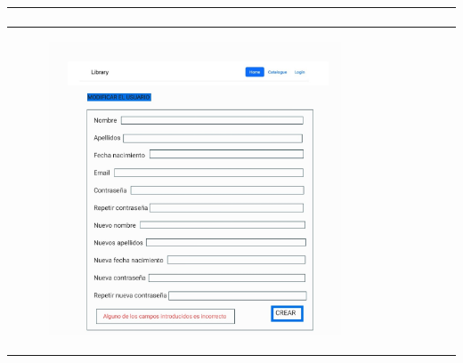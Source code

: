 \documentclass{report}
\begin{document}
\begin{center}
\begin{longtable}{|p{\linewidth}|}
\begin{figure}[H]
                        \end{figure}\\
                        \hline
                        \begin{figure}[H]
                            \centering
                            \includegraphics[width=0.8\textwidth]{./img/grafico/ErrorModificarUsu.jpg}
                        \end{figure}\\
                        \hline
                    \end{longtable}
                \end{center}
                \clearpage
\end{document}
